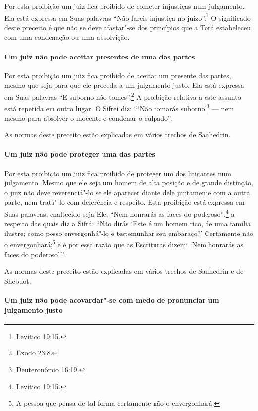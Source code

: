 \begin{multicols}{2}
Por esta proibição um juiz fica proibido de cometer injustiças num
julgamento. Ela está expressa em Suas palavras ``Não fareis injustiça no
juízo''.\footnote{Levítico 19:15.} O significado deste preceito é que não se deve
afastar"-se dos princípios que a Torá\starr{} estabeleceu com uma condenação ou
uma absolvição.

\paragraph{Um juiz não pode aceitar presentes de uma das partes}

Por esta proibição um juiz fica proibido de aceitar um presente das
partes, mesmo que seja para que ele proceda a um julgamento justo. Ela
está expressa em Suas palavras ``E suborno não tomes''.\footnote{Êxodo 23:8.} A
proibição relativa a este assunto está repetida em outro lugar. O Sifrei\starr{}
diz: ```Não tomarás suborno'\footnote{Deuteronômio 16:19.} --- nem mesmo para
absolver o inocente e condenar o culpado''.

As normas deste preceito estão explicadas em vários trechos de Sanhedrin\starr.

\paragraph{Um juiz não pode proteger uma das partes}

Por esta proibição um juiz fica proibido de proteger um dos litigantes
num julgamento. Mesmo que ele seja um homem de alta posição e de grande
distinção, o juiz não deve reverenciá"-lo se ele aparecer diante dele
juntamente com a outra parte, nem tratá"-lo com deferência e respeito.
Esta proibição está expressa em Suas palavras, enaltecido seja Ele,
``Nem honrarás as faces do poderoso'',\footnote{Levítico 19:15.} a respeito das
quais diz a Sifrá\starr: ``Não dirás `Este é um homem rico, de uma família
ilustre; como posso envergonhá"-lo e testemunhar seu embaraço?'
Certamente não o envergonhará;\footnote{A pessoa que pensa de tal forma certamente não o envergonhará.} e é por essa razão
que as Escrituras dizem: `Nem honrarás as faces do poderoso'\,''.

As normas deste preceito estão explicadas em vários trechos de Sanhedrin\starr{} e de Shebuot\starr.

\paragraph{Um juiz não pode acovardar"-se com medo de pronunciar um julgamento justo}


\end{multicols}
